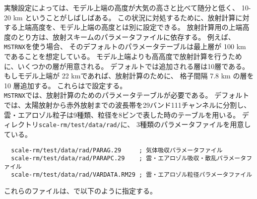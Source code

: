 実験設定によっては、モデル上端の高度が大気の高さと比べて随分と低く、
10-20 km ということがしばしばある。
この状況に対処するために、放射計算に対する上端高度を、モデル上端の高度とは別に設定できる。
放射計算用の上端高度のとり方は、放射スキームのパラメータファイルに依存する。
例えば、\verb|MSTRNX|を使う場合、
そのデフォルトのパラメータテーブルは最上層が 100 km であることを想定している。
モデル上端よりも高高度で放射計算を行うために、いくつかの層が用意される。
デフォルトでは追加される層は10層である。
もしモデル上端が 22 kmであれば、放射計算のために、
格子間隔 7.8 km の層を 10 層追加する。
これらはで設定する。\\

\verb|MSTRNX|では、放射計算のためのパラメータテーブルが必要である。
デフォルトでは、太陽放射から赤外放射までの波長帯を29バンド111チャンネルに分割し、
雲・エアロゾル粒子は9種類、粒径を8ビンで表した時のテーブルを用いる。
ディレクトリ\verb|scale-rm/test/data/rad/|に、
3種類のパラメータファイルを用意している。
\begin{verbatim}
  scale-rm/test/data/rad/PARAG.29     ; 気体吸収パラメータファイル
  scale-rm/test/data/rad/PARAPC.29    ; 雲・エアロゾル吸収・散乱パラメータファイル
  scale-rm/test/data/rad/VARDATA.RM29 ; 雲・エアロゾル粒径パラメータファイル
\end{verbatim}
これらのファイルは、で以下のように指定する。\\

\\

